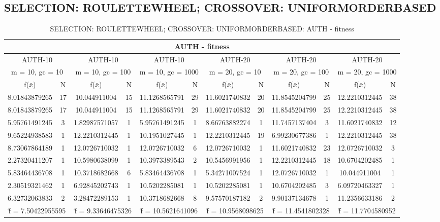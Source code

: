 \subsection{SELECTION: ROULETTEWHEEL; CROSSOVER: UNIFORMORDERBASED}
\begin{table}[H]
	\centering
	\caption{SELECTION: ROULETTEWHEEL; CROSSOVER: UNIFORMORDERBASED: AUTH - fitness}
	\begin{adjustbox}{width=1\textwidth}
		\begin{tabular}{ |c|c||c|c||c|c||c|c||c|c||c|c| }
			\hline
			\multicolumn{12}{|c|}{AUTH - fitness} \\
			\hline
			\multicolumn{2}{|c||}{AUTH-10} & \multicolumn{2}{c||}{AUTH-10} & \multicolumn{2}{c||}{AUTH-10} & \multicolumn{2}{c||}{AUTH-20} & \multicolumn{2}{c||}{AUTH-20} & \multicolumn{2}{c|}{AUTH-20}\\
			\hline
			\multicolumn{2}{|c||}{m = 10, gc = 10} & \multicolumn{2}{c||}{m = 10, gc = 100} & \multicolumn{2}{c||}{m = 10, gc = 1000} & \multicolumn{2}{c||}{m = 20, gc = 10} & \multicolumn{2}{c||}{m = 20, gc = 100} & \multicolumn{2}{c|}{m = 20, gc = 1000}\\
			\hline
			f($\bar{x}$) & N & f($\bar{x}$) & N & f($\bar{x}$) & N & f($\bar{x}$) & N & f($\bar{x}$) & N & f($\bar{x}$) & N\\
			\hline
			\hline
			8.01843879265 & 17 & 10.044911004 & 15 & 11.1268565791 & 29 & 11.6021740832 & 20 & 11.8545204799 & 25 & 12.2210312445 & 38\\
			\hline
			8.01843879265 & 17 & 10.044911004 & 15 & 11.1268565791 & 29 & 11.6021740832 & 20 & 11.8545204799 & 25 & 12.2210312445 & 38\\
			5.95761491245 & 3 & 1.82987571057 & 1 & 5.95761491245 & 1 & 8.66763882274 & 1 & 11.7457137404 & 3 & 11.6021740832 & 12\\
			9.65224938583 & 1 & 12.2210312445 & 1 & 10.1951027445 & 1 & 12.2210312445 & 19 & 6.99230677386 & 1 & 12.2210312445 & 38\\
			8.73067864189 & 1 & 12.0726710032 & 1 & 12.0726710032 & 6 & 12.0726710032 & 1 & 11.6021740832 & 23 & 12.0726710032 & 3\\
			2.27320411207 & 1 & 10.5980638099 & 1 & 10.3973389543 & 2 & 10.5456991956 & 1 & 12.2210312445 & 18 & 10.6704202485 & 1\\
			5.83464436708 & 1 & 10.3718682668 & 6 & 5.83464436708 & 1 & 5.34271007524 & 1 & 12.0726710032 & 1 & 10.044911004 & 1\\
			2.30519321462 & 1 & 6.92845202743 & 1 & 10.5202285081 & 1 & 10.5202285081 & 1 & 10.6704202485 & 3 & 6.09720463327 & 1\\
			6.32732063833 & 2 & 3.28472289153 & 1 & 10.3718682668 & 8 & 9.57570187182 & 2 & 9.90137134678 & 1 & 11.2356633186 & 2\\
			\hline
			\multicolumn{2}{|c||}{\^{f} = 7.50422955595} & \multicolumn{2}{c||}{\^{f} = 9.33646475326} & \multicolumn{2}{c||}{\^{f} = 10.5621641096} & \multicolumn{2}{c||}{\^{f} = 10.9568098625} & \multicolumn{2}{c||}{\^{f} = 11.4541802328} & \multicolumn{2}{c|}{\^{f} = 11.7704580952}\\
			\hline
		\end{tabular}
	\end{adjustbox}
\end{table}
